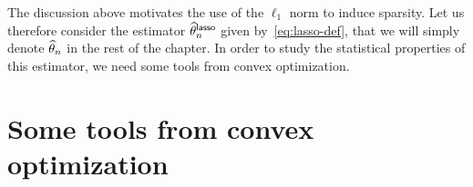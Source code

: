 

The discussion above motivates the use of the $\ell_1$ norm to induce sparsity.
Let us therefore consider the estimator $\widehat \theta_n^{\mathsf{lasso}}$ given by~\eqref{eq:lasso-def}, that we will simply denote $\widehat \theta_n$ in the rest of the chapter.
In order to study the statistical properties of this estimator, we need some tools from convex optimization.



\section{Some tools from convex optimization} %
\label{sec:some_tools_from_convex_optimization}

